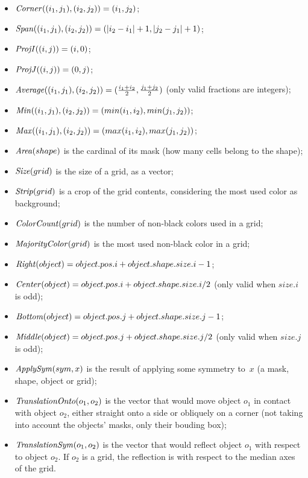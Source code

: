 \documentclass[a4paper]{llncs}
\begin{document}
\begin{itemize}
\item ${\it Corner}((i_1,j_1), (i_2,j_2)) = (i_1,j_2)$;
\item ${\it Span}((i_1,j_1), (i_2,j_2)) = (|i_2 - i_1|+1, |j_2 - j_1|+1)$;
\item ${\it ProjI}((i,j)) = (i,0)$;
\item ${\it ProjJ}((i,j)) = (0,j)$;
\item ${\it Average}((i_1,j_1), (i_2,j_2)) = (\frac{i_1+i_2}{2}, \frac{j_1+j_2}{2})$ (only valid fractions are integers);
\item ${\it Min}((i_1,j_1), (i_2,j_2)) = (min(i_1,i_2), min(j_1,j_2))$;
\item ${\it Max}((i_1,j_1), (i_2,j_2)) = (max(i_1,i_2), max(j_1,j_2))$;
\item ${\it Area}(shape)$ is the cardinal of its mask (how many cells belong to the shape);
\item ${\it Size}(grid)$ is the size of a grid, as a vector;
\item ${\it Strip}(grid)$ is a crop of the grid contents, considering the most used color as background; 
\item ${\it ColorCount}(grid)$ is the number of non-black colors used in a grid;
\item ${\it MajorityColor}(grid)$ is the most used non-black color in a grid;
\item ${\it Right}(object) = object.pos.i + object.shape.size.i - 1$;
\item ${\it Center}(object) = object.pos.i + object.shape.size.i / 2$ (only valid when $size.i$ is odd);
\item ${\it Bottom}(object) = object.pos.j + object.shape.size.j - 1$;
\item ${\it Middle}(object) = object.pos.j + object.shape.size.j / 2$ (only valid when $size.j$ is odd);
\item ${\it ApplySym}(sym,x)$ is the result of applying some symmetry to~$x$ (a mask, shape, object or grid); 
\item ${\it TranslationOnto}(o_1,o_2)$ is the vector that would move
  object $o_1$ in contact with object $o_2$, either straight onto a
  side or obliquely on a corner (not taking into account the objects'
  masks, only their bouding box);
\item ${\it TranslationSym}(o_1,o_2)$ is the vector that would reflect
  object $o_1$ with respect to object $o_2$. If $o_2$ is a grid, the
  reflection is with respect to the median axes of the grid.

\end{itemize}
\end{document}
